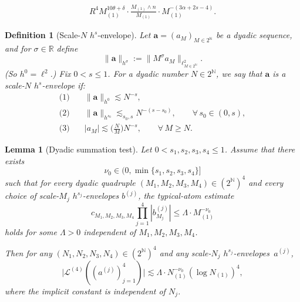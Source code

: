 \documentclass[10pt,a4paper]{amsart}
\newtheorem{definition}{Definition}
\newtheorem{lemma}{Lemma}
\newcommand{\N}{\mathbb{N}}
\begin{document}
	\begin{align}
		R^4 M_{(1)}^{10\theta+\delta}\cdot\frac{M_{(1)}\wedge n}{M_{(1)}}\cdot M_{(1)}^{-(3\alpha+2s-4)}.
	\end{align}

\begin{definition}[Scale-$N$ $h^{s}$-envelope]\label{def:scale-seq}
	Let $\mathbf{a}=(a_M)_{M\in 2^{\mathbb N}}$ be a dyadic sequence, and for $\sigma\in\mathbb R$ define
	\[
	\|\mathbf{a}\|_{h^{\sigma}} := \bigl\| M^{\sigma} a_M \bigr\|_{\ell^2_{M\in 2^{\mathbb N}}}.
	\]
	(So $h^0=\ell^2$.) Fix $0<s\leq 1$. For a dyadic number $N\in 2^{\mathbb N}$, we say that $\mathbf{a}$ is a \emph{scale-$N$ $h^{s}$-envelope} if:
	\begin{align*}
		\text{(1)}\quad & \|\mathbf{a}\|_{h^0} \lesssim N^{-s},\\
		\text{(2)}\quad & \|\mathbf{a}\|_{h^{s_0}} \lesssim_{s_0,s} N^{-(s-s_0)},\qquad \forall\, s_0\in(0,s),\\
		\text{(3)}\quad & |a_M|\lesssim \Big(\frac{N}{M}\Big) N^{-s},\qquad \forall\, M\ge N.
	\end{align*}
\end{definition}

\begin{lemma}[Dyadic summation test]\label{lem:sum-abstract}
	Let $0<s_1,s_2,s_3,s_4\leq 1$. Assume that there exists
	\[
	\nu_0\in \Big(0,\min\{s_1,s_2,s_3,s_4\}\Big]
	\]
	such that for every dyadic quadruple $(M_1,M_2,M_3,M_4)\in (2^{\N})^4$ and every choice of scale-$M_j$ $h^{s_j}$-envelopes $b^{(j)}$, the typical-atom estimate
	\begin{equation}\label{eq:typical-atom-output-gain}
		c_{M_1,M_2,M_3,M_4}\prod_{j=1}^4 |b^{(j)}_{M_j}|
		\leq
		\Lambda\cdot M_{(1)}^{-\nu_0}
	\end{equation}
	holds for some $\Lambda>0$ independent of $M_1,M_2,M_3,M_4$.

	Then for any $(N_1,N_2,N_3,N_4)\in(2^{\N})^4$ and any scale-$N_j$ $h^{s_j}$-envelopes~$a^{(j)}$,
	\begin{equation}\label{eq:dyadic-sum-output-gain}
		\big|\mathcal{L}^{(4)}((a^{(j)})_{j=1}^4)\big|
		\lesssim
		\Lambda\cdot N_{(1)}^{-\nu_0}(\log N_{(1)})^4,
	\end{equation}
	where the implicit constant is independent of $N_j$.
\end{lemma}
\end{document}
